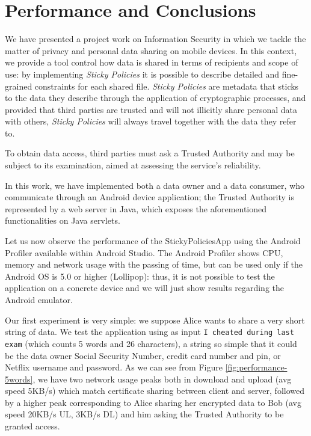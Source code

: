 \chapter{Performance and Conclusions}
\label{chapter4}
\thispagestyle{empty}

\noindent We have presented a project work on Information Security in which we tackle the matter of privacy and personal data sharing on mobile devices. In this context, we provide a tool control how data is shared in terms of recipients and scope of use: by implementing \textit{Sticky Policies} it is possible to describe detailed and fine-grained constraints for each shared file. \textit{Sticky Policies} are metadata that sticks to the data they describe through the application of cryptographic processes, and provided that third parties are trusted and will not illicitly share personal data with others, \textit{Sticky Policies} will always travel together with the data they refer to.

To obtain data access, third parties must ask a Trusted Authority and may be subject to its examination, aimed at assessing the service's reliability.

In this work, we have implemented both a data owner and a data consumer, who communicate through an Android device application; the Trusted Authority is represented by a web server in Java, which exposes the aforementioned functionalities on Java servlets.

Let us now observe the performance of the StickyPoliciesApp using the Android Profiler available within Android Studio. The Android Profiler shows CPU, memory and network usage with the passing of time, but can be used only if the Android OS is 5.0 or higher (Lollipop): thus, it is not possible to test the application on a concrete device and we will just show results regarding the Android emulator.

Our first experiment is very simple: we suppose Alice wants to share a very short string of data. We test the application using as input \texttt{I cheated during last exam} (which counts 5 words and 26 characters), a string so simple that it could be the data owner Social Security Number, credit card number and pin, or Netflix username and password. As we can see from Figure \ref{fig:performance-5words}, we have two network usage peaks both in download and upload (avg speed 5KB/s) which match certificate sharing between client and server, followed by a higher peak corresponding to Alice sharing her encrypted data to Bob (avg speed 20KB/s UL, 3KB/s DL) and him asking the Trusted Authority to be granted access.

